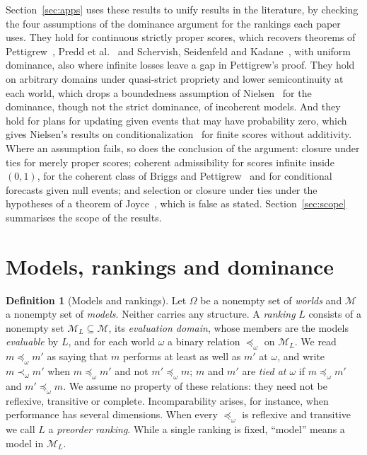 \documentclass[11pt]{article}
\theoremstyle{definition}
\newtheorem{definition}[theorem]{Definition}
\theoremstyle{remark}
\newcommand{\M}{\mathcal M}
\begin{document}
Section~\ref{sec:apps} uses these results to unify results in the literature, by checking the four assumptions of the dominance argument for the rankings each paper uses. They hold for continuous strictly proper scores, which recovers theorems of Pettigrew~\cite{Pettigrew}, Predd et al.~\cite{Predd} and Schervish, Seidenfeld and Kadane~\cite{SSK09}, with uniform dominance, also where infinite losses leave a gap in Pettigrew's proof. They hold on arbitrary domains under quasi-strict propriety and lower semicontinuity at each world, which drops a boundedness assumption of Nielsen~\cite{Nielsen} for the dominance, though not the strict dominance, of incoherent models. And they hold for plans for updating given events that may have probability zero, which gives Nielsen's results on conditionalization~\cite{Nielsen21} for finite scores without additivity. Where an assumption fails, so does the conclusion of the argument: closure under ties for merely proper scores; coherent admissibility for scores infinite inside $(0,1)$, for the coherent class of Briggs and Pettigrew~\cite{BP20} and for conditional forecasts given null events; and selection or closure under ties under the hypotheses of a theorem of Joyce~\cite{Joyce}, which is false as stated. Section~\ref{sec:scope} summarises the scope of the results.

\section{Models, rankings and dominance}\label{sec:setting}

\begin{definition}[Models and rankings]\label{def:rankings}
Let $\Omega$ be a nonempty set of \emph{worlds} and $\M$ a nonempty set of \emph{models}. Neither carries any structure. A \emph{ranking} $L$ consists of a nonempty set $\M_L\subseteq\M$, its \emph{evaluation domain}, whose members are the models \emph{evaluable} by $L$, and for each world $\omega$ a binary relation $\preceq_\omega$ on $\M_L$. We read $m\preceq_\omega m'$ as saying that $m$ performs at least as well as $m'$ at $\omega$, and write $m\prec_\omega m'$ when $m\preceq_\omega m'$ and not $m'\preceq_\omega m$; $m$ and $m'$ are \emph{tied at $\omega$} if $m\preceq_\omega m'$ and $m'\preceq_\omega m$. We assume no property of these relations: they need not be reflexive, transitive or complete. Incomparability arises, for instance, when performance has several dimensions. When every $\preceq_\omega$ is reflexive and transitive we call $L$ a \emph{preorder ranking}. While a single ranking is fixed, ``model'' means a model in $\M_L$.
\end{definition}
\end{document}
